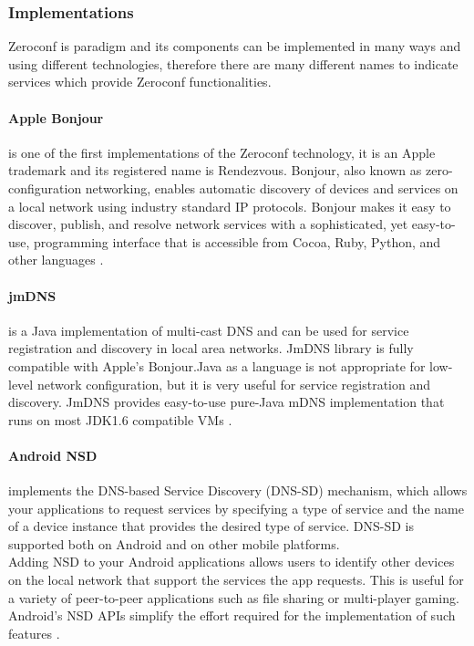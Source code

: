 \subsubsection{Implementations}
Zeroconf is paradigm and its components can be implemented in many ways and using different technologies, therefore there are many different names to indicate services which provide Zeroconf functionalities.
\paragraph{Apple Bonjour} is one of the first implementations of the Zeroconf technology, it is an Apple trademark and its registered name is Rendezvous. Bonjour, also known as zero-configuration networking, enables automatic discovery of devices and services on a local network using industry standard IP protocols. Bonjour makes it easy to discover, publish, and resolve network services with a sophisticated, yet easy-to-use, programming interface that is accessible from Cocoa, Ruby, Python, and other languages \cite{apple2017bonjour}.

\paragraph{jmDNS} is a Java implementation of multi-cast DNS and can be used for service registration and discovery in local area networks. JmDNS library is fully compatible with Apple's Bonjour.Java as a language is not appropriate for low-level network configuration, but it is very useful for service registration and discovery. JmDNS provides easy-to-use pure-Java mDNS implementation that runs on most JDK1.6 compatible VMs \cite{sourceforge2011jmdns}.

\paragraph{Android NSD} \label{androidNSD} implements the DNS-based Service Discovery (DNS-SD) mechanism, which allows your applications to request services by specifying a type of service and the name of a device instance that provides the desired type of service. DNS-SD is supported both on Android and on other mobile platforms.\\
Adding NSD to your Android applications allows users to identify other devices on the local network that support the services the app requests. This is useful for a variety of peer-to-peer applications such as file sharing or multi-player gaming. Android's NSD APIs simplify the effort required for the implementation of such features \cite{devandroidnsd}.

